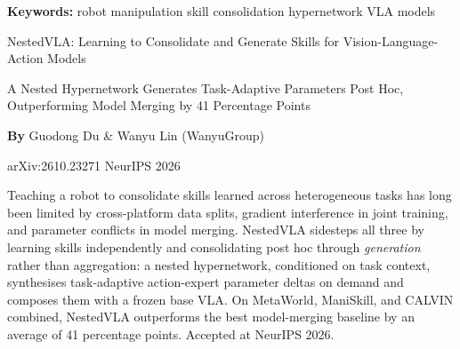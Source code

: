 \documentclass[10pt,twocolumn]{article}
\begin{document}
\setlength{\parindent}{0pt}
\setlength{\parskip}{4pt}

{\small\color{keywordgray}\textbf{Keywords:}
  robot manipulation \textbullet{}
  skill consolidation \textbullet{}
  hypernetwork \textbullet{}
  VLA models}\par\vspace{4pt}

{\LARGE\bfseries\raggedright
  NestedVLA: Learning to Consolidate and Generate Skills for
  Vision-Language-Action Models}\par\vspace{4pt}

{\large\itshape\raggedright
  A Nested Hypernetwork Generates Task-Adaptive Parameters Post Hoc,
  Outperforming Model Merging by 41 Percentage Points}\par\vspace{6pt}

{\small\textbf{By} Guodong Du \& Wanyu Lin (WanyuGroup)}\par\vspace{2pt}

{\small\color{keywordgray}arXiv:2610.23271 \textbullet{}
  NeurIPS 2026}
\par\vspace{2pt}\noindent{\color{rulered}\rule{\columnwidth}{0.6pt}}\vspace{6pt}

Teaching a robot to consolidate skills learned across heterogeneous tasks
has long been limited by cross-platform data splits, gradient interference
in joint training, and parameter conflicts in model merging. NestedVLA sidesteps
all three by learning skills independently and consolidating post hoc through
\textit{generation} rather than aggregation: a nested hypernetwork, conditioned
on task context, synthesises task-adaptive action-expert parameter deltas
on demand and composes them with a frozen base VLA. On MetaWorld, ManiSkill,
and CALVIN combined, NestedVLA outperforms the best model-merging baseline
by an average of 41 percentage points. Accepted at NeurIPS 2026.
\end{document}
